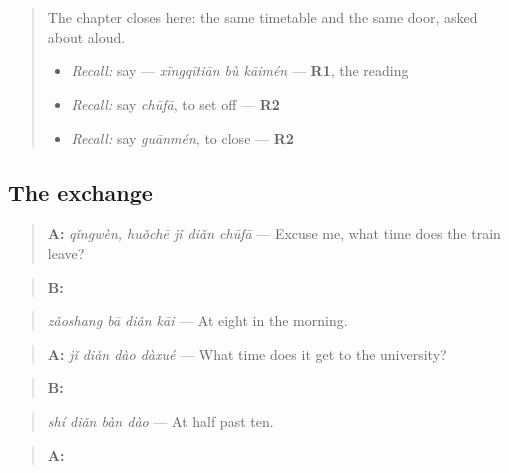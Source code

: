 \section[Practice]{}

\label{lesson:ZH-C155-practice}



\begin{quote}
The chapter closes here: the same timetable and the same door, asked about aloud.

\begin{itemize}
\raggedright
  \item \emph{Recall:} say  — \emph{xīngqītiān bù kāimén} — \textbf{R1}, the reading
  \item \emph{Recall:} say \emph{chūfā}, to set off — \textbf{R2}
  \item \emph{Recall:} say \emph{guānmén}, to close — \textbf{R2}
\end{itemize}
\end{quote}

\subsection*{The exchange}
\begin{quote}
\textbf{A:} \emph{qǐngwèn, huǒchē jǐ diǎn chūfā} — Excuse me, what time does the train leave?
\end{quote}

\begin{quote}
\textbf{B:} 
\end{quote}

\begin{quote}
\emph{zǎoshang bā diǎn kāi} — At eight in the morning.
\end{quote}

\begin{quote}
\textbf{A:} \emph{jǐ diǎn dào dàxué} — What time does it get to the university?
\end{quote}

\begin{quote}
\textbf{B:} 
\end{quote}

\begin{quote}
\emph{shí diǎn bàn dào} — At half past ten.
\end{quote}

\begin{quote}
\textbf{A:}  
\end{quote}


